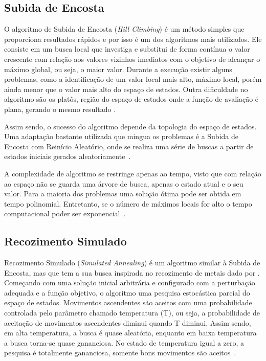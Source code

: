\subsection{Subida de Encosta}
\label{sec:subidaDeEncosta}

O algoritmo de Subida de Encosta (\textit{Hill Climbing}) é um método simples que proporciona resultados rápidos e por isso é um dos algoritmos mais utilizados. Ele consiste em um busca local que investiga e substitui de forma contínua o valor crescente com relação aos valores vizinhos imediatos com o objetivo de alcançar o máximo global, ou seja, o maior valor. Durante a execução existir alguns problemas, como a identificação de um valor local mais alto, máximo local, porém ainda menor que o valor mais alto do espaço de estados. Outra dificuldade no algoritmo são os platôs, região do espaço de estados onde a função de avaliação é plana, gerando o mesmo resultado \cite{russell2016artificial}.

Assim sendo, o sucesso do algoritmo depende da topologia do espaço de estados. Uma adaptação bastante utilizada que mingua os problemas é a Subida de Encosta com Reinício Aleatório, onde se realiza uma série de buscas a partir de estados iniciais gerados aleatoriamente~\cite{russell2016artificial}. 

A complexidade de algoritmo se restringe apenas ao tempo, visto que com relação ao espaço não se guarda uma árvore de busca, apenas o estado atual e o seu valor. Para a maioria dos problemas uma solução ótima pode ser obtida em tempo polinomial. Entretanto, se o número de máximos locais for alto o tempo computacional poder ser exponencial~\cite{skiena1998algorithm}.

\subsection{Recozimento Simulado}
\label{sec:recozimentoSimulado}

Recozimento Simulado (\textit{Simulated Annealing}) é um algoritmo similar à Subida de Encosta, mas que tem a sua busca inspirada no recozimento de metais dado por . Começando com uma solução inicial arbitrária e configurado com a perturbação adequada e a função objetivo, o algoritmo uma pesquisa estocástica parcial do espaço de estados. Movimentos ascendentes são aceitos com uma probabilidade controlada pelo parâmetro chamado temperatura (T), ou seja, a probabilidade de aceitação de movimentos ascendentes diminui quando T diminui. Assim sendo, em alta temperatura, a busca é quase aleatória, enquanto em baixa temperatura a busca torna-se quase gananciosa. No estado de temperatura igual a zero, a pesquisa é totalmente gananciosa, somente bons movimentos são aceitos~\cite{kirkpatrick1983optimization}.

